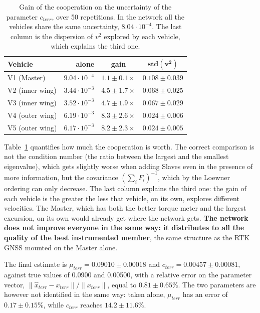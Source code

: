 \documentclass[conference,9pt]{IEEEtran}
\begin{document}
\begin{table}[t]
\centering
\caption{Gain of the cooperation on the uncertainty of the parameter
$c_{terr}$, over 50 repetitions. In the network all the vehicles share the same
uncertainty, $8.04\cdot10^{-4}$. The last column is the dispersion of $v^2$
explored by each vehicle, which explains the third one.}
\label{tab:dwls_gain}
\begin{tabular}{lrcc}
\toprule
\textbf{Vehicle} & \textbf{alone} & \textbf{gain} & $\mathbf{std(v^2)}$\\
\midrule
V1 (Master)     & $9.04\cdot10^{-4}$ & $1.1 \pm 0.1\times$ & $0.108 \pm 0.039$\\
V2 (inner wing) & $3.44\cdot10^{-3}$ & $\mathbf{4.5 \pm 1.7\times}$ & $0.068 \pm 0.025$\\
V3 (inner wing) & $3.52\cdot10^{-3}$ & $\mathbf{4.7 \pm 1.9\times}$ & $0.067 \pm 0.029$\\
V4 (outer wing) & $6.19\cdot10^{-3}$ & $\mathbf{8.3 \pm 2.6\times}$ & $0.024 \pm 0.006$\\
V5 (outer wing) & $6.17\cdot10^{-3}$ & $\mathbf{8.2 \pm 2.3\times}$ & $0.024 \pm 0.005$\\
\bottomrule
\end{tabular}
\end{table}

Table~\ref{tab:dwls_gain} quantifies how much the cooperation is worth. The
correct comparison is not the condition number (the ratio between the largest
and the smallest eigenvalue), which gets slightly worse when adding Slaves even
in the presence of more information, but the covariance $(\sum_i F_i)^{-1}$,
which by the Loewner ordering can only decrease. The last column explains the
third one: the gain of each vehicle is the greater the less that vehicle, on
its own, explores different velocities. The Master, which has both the better
torque meter and the largest excursion, on its own would already get where the
network gets. \textbf{The network does not improve everyone in the same way: it
distributes to all the quality of the best instrumented member}, the same
structure as the RTK GNSS mounted on the Master alone.

The final estimate is $\mu_{terr} = 0.09010 \pm 0.00018$ and
$c_{terr} = 0.00457 \pm 0.00081$, against true values of 0.0900 and 0.00500,
with a relative error on the parameter vector,
$\lVert \hat x_{terr} - x_{terr}\rVert / \lVert x_{terr} \rVert$, equal to
$\mathbf{0.81 \pm 0.65\%}$. The two parameters are however not identified in
the same way: taken alone, $\mu_{terr}$ has an error of $0.17 \pm 0.15\%$,
while $c_{terr}$ reaches $\mathbf{14.2 \pm 11.6\%}$.
\end{document}
